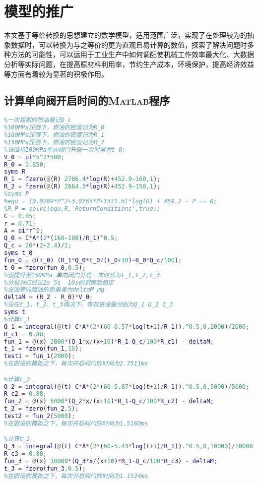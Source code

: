 \documentclass[withoutpreface,bwprint]{cumcmthesis} %
\begin{document}
\section{模型的推广}
本文基于等价转换的思想建立的数学模型，适用范围广泛，实现了在处理较为的抽象数据时，可以转换为与之等价的更为直观且易计算的数值，探索了解决问题时多种方法的可能性，可以运用于工业生产中如何调配使机械工作效率最大化、大数据分析等实际问题，在提高原材料利用率，节约生产成本，环境保护，提高经济效益等方面有着较为显著的积极作用。


\newpage
\begin{appendices}
\section{计算单向阀开启时间的\textsc{Matlab}程序}
\begin{lstlisting}[language=matlab]
%高压油管的容积为V_0
%一次周期的喷油量记Q_c
%100MPa压强下，燃油的密度记为R_0
%160MPa压强下，燃油的密度记为R_1
%150MPa压强下，燃油的密度记为R_2
%设维持100MPa单向阀门开启一次时常为t_0;
V_0 = pi*5^2*500;
R_0 = 0.850;
syms R
R_1 = fzero(@(R) 2786.4*log(R)+452.9-160,1);
R_2 = fzero(@(R) 2664.3*log(R)+452.9-150,1);
%syms P
%equ = (0.0289*P^2+3.0765*P+1571.6)*log(R) + 459.2 - P == 0;
%R_P = solve(equ,R,'ReturnConditions',true);
C = 0.85;
r = 0.71;
A = pi*r^2;
Q_0 = C*A*(2*(160-100)/R_1)^0.5;
Q_c = 20*(2+2.4)/2;
syms t_0
fun_0 = @(t_0) (R_1*Q_0*t_0/(t_0+10)-R_0*Q_c/100);
t_0 = fzero(fun_0,0.5);
%设提升至150MPa 单向阀门开启一次时长为t_1,t_2,t_3
%分别对应经过2s 5s  10s的调整后稳定
%设油管内燃油的质量差为deltaM mg
deltaM = (R_2 - R_0)*V_0;
%设在t_1、t_2、t_3情况下，等效进油量分别为Q_1 Q_2 Q_3
syms t
%计算t_1
Q_1 = integral(@(t) C*A*(2*(60-6.57*log(t+1)/R_1)).^0.5,0,2000)/2000;
R_c1 = 0.88;
fun_1 = @(x) 2000*(Q_1*x/(x+10)*R_1-Q_c/100*R_c1) - deltaM;
t_1 = fzero(fun_1,10);
test1 = fun_1(2000);
%在假设的模拟之下，每次开启阀门的时间为2.7511ms

%计算t_2
Q_2 = integral(@(t) C*A*(2*(60-5.87*log(t+1)/R_1)).^0.5,0,5000)/5000;
R_c2 = 0.88;
fun_2 = @(x) 5000*(Q_2*x/(x+10)*R_1-Q_c/100*R_c2) - deltaM;
t_2 = fzero(fun_2,5);
test2 = fun_2(5000);
%在假设的模拟之下，每次开启阀门的时间为1.5160ms

%计算t_3
Q_3 = integral(@(t) C*A*(2*(60-5.43*log(t+1)/R_1)).^0.5,0,10000)/10000;
R_c3 = 0.88;
fun_3 = @(x) 10000*(Q_3*x/(x+10)*R_1-Q_c/100*R_c3) - deltaM;
t_3 = fzero(fun_3,0.5);
%在假设的模拟之下，每次开启阀门的时间为1.1524ms



\end{lstlisting}
\end{appendices}
\end{document}
